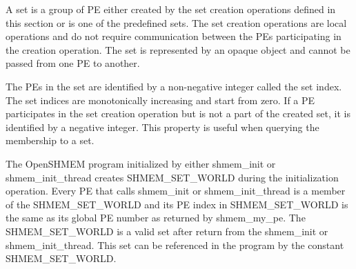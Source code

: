 A set is a group of \ac{PE} either created by the set creation operations defined in this section or is one of the predefined sets. The set creation operations are local operations and do not require communication between the \acp{PE} participating in the creation operation. The set is represented by an opaque object and cannot be passed from one \ac{PE} to another.

The \acp{PE} in the set are identified by a non-negative integer called the set index. The set indices are monotonically increasing and start from zero. If a \ac{PE} participates in the set creation operation but is not a part of the created set, it is identified by a negative integer. This property is useful when querying the membership to a set.

The OpenSHMEM program initialized by either shmem\_init or shmem\_init\_thread creates SHMEM\_SET\_WORLD during the initialization operation. Every \ac{PE} that calls shmem\_init or shmem\_init\_thread is a member of the SHMEM\_SET\_WORLD and its \ac{PE} index in SHMEM\_SET\_WORLD is the same as its global \ac{PE} number as returned by shmem\_my\_pe. The SHMEM\_SET\_WORLD is a valid set after return from the shmem\_init or shmem\_init\_thread. This set can be referenced in the program by the constant SHMEM\_SET\_WORLD.
